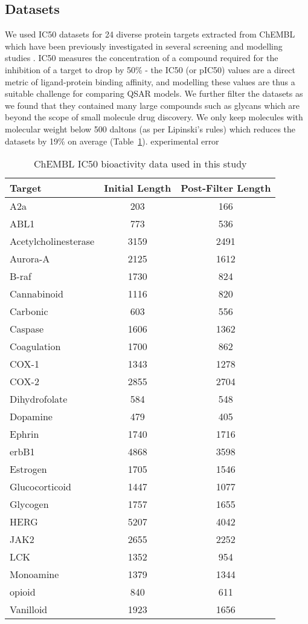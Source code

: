 \subsection{Datasets}\label{subsec:datasets}
We used IC50 datasets for 24 diverse protein targets extracted from ChEMBL which have been previously investigated in several screening and modelling studies \cite{Bender2018, Bender2019} . IC50 measures the concentration of a compound required for the inhibition of a target to drop by 50\% - the IC50 (or pIC50) values are a direct metric of ligand-protein binding affinity, and modelling these values are thus a suitable challenge for comparing QSAR models. We further filter the datasets as we found that they contained many large compounds such as glycans which are beyond the scope of small molecule drug discovery. We only keep molecules with molecular weight below 500 daltons (as per Lipinski's rules) which reduces the datasets by 19\% on average (Table~\ref{table:bender_datasets}). experimental error

\begin{table}[!h]
\caption{ChEMBL IC50 bioactivity data used in this study}
\centering
\label{table:bender_datasets}
\begin{tabular}{lcc}
\toprule
Target & Initial Length & Post-Filter Length \\ 
\midrule
A2a & 203 & 166\\
ABL1 & 773 & 536\\
Acetylcholinesterase & 3159 & 2491\\
Aurora-A & 2125 & 1612\\
B-raf & 1730 & 824\\
Cannabinoid & 1116 & 820\\
Carbonic & 603 & 556\\
Caspase & 1606 & 1362\\
Coagulation & 1700 & 862\\
COX-1 & 1343 & 1278\\
COX-2 & 2855 & 2704\\
Dihydrofolate & 584 & 548\\
Dopamine & 479 & 405\\
Ephrin & 1740 & 1716\\
erbB1 & 4868 & 3598\\
Estrogen & 1705 & 1546\\
Glucocorticoid & 1447 & 1077\\
Glycogen & 1757 & 1655\\
HERG & 5207 & 4042\\
JAK2 & 2655 & 2252\\
LCK & 1352 & 954\\
Monoamine & 1379 & 1344\\
opioid & 840 & 611\\
Vanilloid & 1923 & 1656\\
\bottomrule
\end{tabular}
\end{table}

